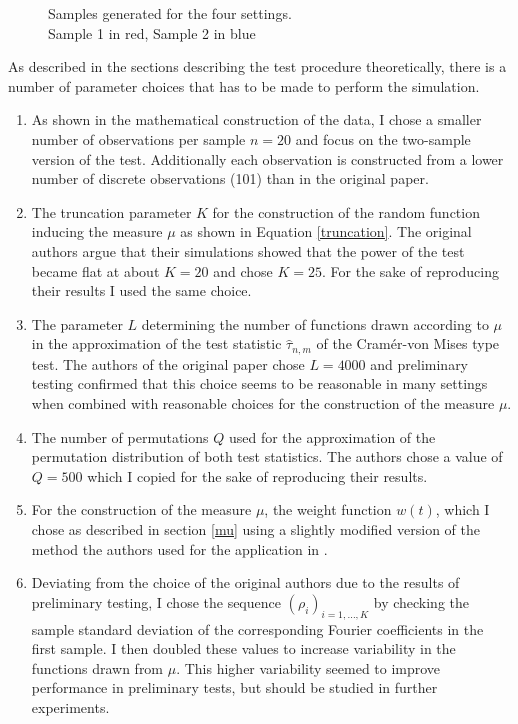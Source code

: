 \documentclass[12pt, a4paper]{article}
\theoremstyle{MAstyle} \newtheorem{assumption}{Assumption}[section]
\theoremstyle{MAstyle} \newtheorem{definition}{Definition}[section]
\theoremstyle{MAstyle} \newtheorem{theorem}{Theorem}[section]
\begin{document}
		\begin{figure}[H]
			\caption{Samples generated for the four settings. \\
			Sample 1 in red, Sample 2 in blue}
			\label{settings}
		\end{figure}
		As described in the sections describing the test procedure theoretically, there is a number of parameter choices that has to be made to perform the simulation.
		\begin{enumerate}
			\item As shown in the mathematical construction of the data, I chose a smaller number of observations per sample $n=20$ and focus on the two-sample version of the test. Additionally each observation is constructed from a lower number of discrete observations (101) than in the original paper.
			\item The truncation parameter $K$ for the construction of the random function inducing the measure $\mu$ as shown in Equation \ref{truncation}. The original authors argue that their simulations showed that the power of the test became flat at about $K = 20$ and chose $K = 25$. For the sake of reproducing their results I used the same choice.
			\item The parameter $L$ determining the number of functions drawn according to $\mu$ in the approximation of the test statistic $\hat{\tau}_{n,m}$ of the Cram\'{e}r-von Mises type test. The authors of the original paper chose $L = 4000$ and preliminary testing confirmed that this choice seems to be reasonable in many settings when combined with reasonable choices for the construction of the measure $\mu$.
			\item The number of permutations $Q$ used for the approximation of the permutation distribution of both test statistics. The authors chose a value of $Q = 500$ which I copied for the sake of reproducing their results.
			\item For the construction of the measure $\mu$, the weight function $w(t)$, which I chose as described in section \ref{mu} using a slightly modified version of the method the authors used for the application in \cite{bugni_permutation_2021}.
			\item Deviating from the choice of the original authors due to the results of preliminary testing, I chose the sequence $\left(\rho_i\right)_{i = 1, \dots, K}$ by checking the sample standard deviation of the corresponding Fourier coefficients in the first sample. I then doubled these values to increase variability in the functions drawn from $\mu$. This higher variability seemed to improve performance in preliminary tests, but should be studied in further experiments.
		\end{enumerate}
		
\end{document}
